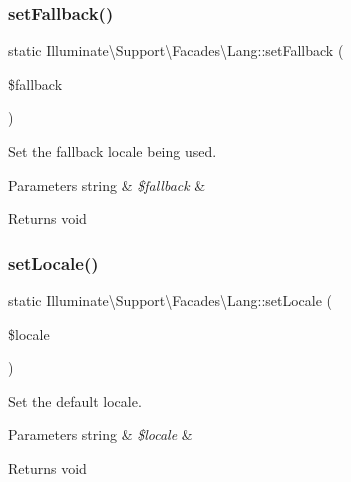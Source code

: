 \subsubsection{\texorpdfstring{set\+Fallback()}{setFallback()}}
{\footnotesize\ttfamily static Illuminate\textbackslash{}\+Support\textbackslash{}\+Facades\textbackslash{}\+Lang\+::set\+Fallback (\begin{DoxyParamCaption}\item[{}]{\$fallback }\end{DoxyParamCaption})\hspace{0.3cm}{\ttfamily [static]}}

Set the fallback locale being used.


\begin{DoxyParams}[1]{Parameters}
string & {\em \$fallback} & \\
\hline
\end{DoxyParams}
\begin{DoxyReturn}{Returns}
void 
\end{DoxyReturn}
\mbox{\label{class_illuminate_1_1_support_1_1_facades_1_1_lang_aee5fdf1c926d12ee4c071974ad8303e4}} 
\subsubsection{\texorpdfstring{set\+Locale()}{setLocale()}}
{\footnotesize\ttfamily static Illuminate\textbackslash{}\+Support\textbackslash{}\+Facades\textbackslash{}\+Lang\+::set\+Locale (\begin{DoxyParamCaption}\item[{}]{\$locale }\end{DoxyParamCaption})\hspace{0.3cm}{\ttfamily [static]}}

Set the default locale.


\begin{DoxyParams}[1]{Parameters}
string & {\em \$locale} & \\
\hline
\end{DoxyParams}
\begin{DoxyReturn}{Returns}
void 
\end{DoxyReturn}
\mbox{\label{class_illuminate_1_1_support_1_1_facades_1_1_lang_a604716b0f8afe89d3597a81029037fcd}} 
